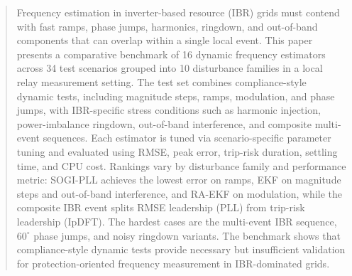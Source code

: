 \begin{abstract}
Frequency estimation in inverter-based resource (IBR) grids must contend with
fast ramps, phase jumps, harmonics, ringdown, and out-of-band components that
can overlap within a single local event. This paper presents a comparative
benchmark of 16 dynamic frequency estimators across 34 test scenarios grouped
into 10 disturbance families in a local relay measurement setting. The test set
combines compliance-style dynamic tests, including magnitude steps, ramps,
modulation, and phase jumps, with IBR-specific stress conditions such as
harmonic injection, power-imbalance ringdown, out-of-band interference, and
composite multi-event sequences. Each estimator is tuned via scenario-specific
parameter tuning and evaluated using RMSE, peak error, trip-risk duration,
settling time, and CPU cost. Rankings vary by disturbance family and
performance metric: SOGI-PLL achieves the lowest error on ramps, EKF on
magnitude steps and out-of-band interference, and RA-EKF on modulation, while
the composite IBR event splits RMSE leadership (PLL) from trip-risk leadership
(IpDFT). The hardest cases are the multi-event IBR sequence, $60^\circ$ phase
jumps, and noisy ringdown variants. The benchmark shows that compliance-style
dynamic tests provide necessary but insufficient validation for
protection-oriented frequency measurement in IBR-dominated grids.
\end{abstract}
